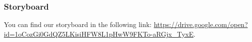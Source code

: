 \subsubsection{Storyboard}

You can find our storyboard in the following link: 
\url{https://drive.google.com/open?id=1oCozGi0GdQZ5LKisiHFW8L1pHwW9FKTo-aRGjx_TyxE}.

